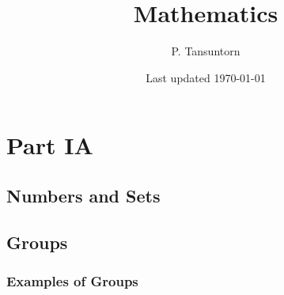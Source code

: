 \documentclass[12pt]{book}
\title{\textbf{Mathematics}}
\author{P. Tansuntorn}
\date{Last updated \today}
\theoremstyle{definition}
\theoremstyle{remark}
\begin{document}
	\frontmatter
	\pagestyle{plain}
	\maketitle
	\tableofcontents
	
	\pagestyle{fancy}
		\fancyhf{}%
		\fancyhead[RO,LE]{\thepage}
		\fancyhead[CO]{\textit{\rightmark}}
		\fancyhead[CE]{\textit{\leftmark}}
		\renewcommand{\headrulewidth}{0pt}
		\renewcommand{\headrulewidth}{0pt}
	
	\mainmatter
	\part{Part IA}
	\chapter{Numbers and Sets}
	\chapter{Groups}
		\section{Examples of Groups}
\end{document}
